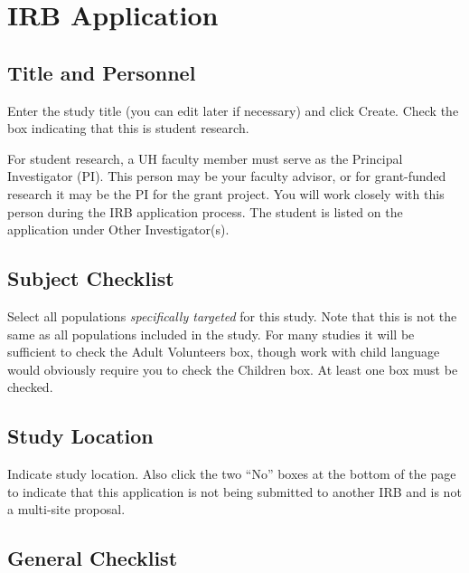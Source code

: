\documentclass[
]{book}
\begin{document}
\hypertarget{irb-application}{%
\section{IRB Application}\label{irb-application}}

\hypertarget{title-and-personnel}{%
\subsection{Title and Personnel}\label{title-and-personnel}}

Enter the study title (you can edit later if necessary) and click Create. Check the box indicating that this is student research.

For student research, a UH faculty member must serve as the Principal Investigator (PI). This person may be your faculty advisor, or for grant-funded research it may be the PI for the grant project. You will work closely with this person during the IRB application process. The student is listed on the application under Other Investigator(s).

\hypertarget{subject-checklist}{%
\subsection{Subject Checklist}\label{subject-checklist}}

Select all populations \emph{specifically targeted} for this study. Note that this is not the same as all populations included in the study. For many studies it will be sufficient to check the Adult Volunteers box, though work with child language would obviously require you to check the Children box. At least one box must be checked.

\hypertarget{study-location}{%
\subsection{Study Location}\label{study-location}}

Indicate study location. Also click the two ``No'' boxes at the bottom of the page to indicate that this application is not being submitted to another IRB and is not a multi-site proposal.

\hypertarget{general-checklist}{%
\subsection{General Checklist}\label{general-checklist}}
\end{document}
